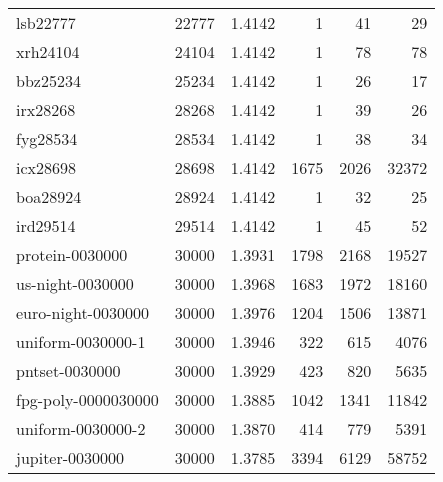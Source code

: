 \begin{tabular}{|lrrrrr|}
lsb22777 & 22777 & \num{1.4142} & \num{1} & \num{41} & \num{29} \\
xrh24104 & 24104 & \num{1.4142} & \num{1} & \num{78} & \num{78} \\
bbz25234 & 25234 & \num{1.4142} & \num{1} & \num{26} & \num{17} \\
irx28268 & 28268 & \num{1.4142} & \num{1} & \num{39} & \num{26} \\
fyg28534 & 28534 & \num{1.4142} & \num{1} & \num{38} & \num{34} \\
icx28698 & 28698 & \num{1.4142} & \num{1675} & \num{2026} & \num{32372} \\
boa28924 & 28924 & \num{1.4142} & \num{1} & \num{32} & \num{25} \\
ird29514 & 29514 & \num{1.4142} & \num{1} & \num{45} & \num{52} \\
protein-0030000 & 30000 & \num{1.3931} & \num{1798} & \num{2168} & \num{19527} \\
us-night-0030000 & 30000 & \num{1.3968} & \num{1683} & \num{1972} & \num{18160} \\
euro-night-0030000 & 30000 & \num{1.3976} & \num{1204} & \num{1506} & \num{13871} \\
uniform-0030000-1 & 30000 & \num{1.3946} & \num{322} & \num{615} & \num{4076} \\
pntset-0030000 & 30000 & \num{1.3929} & \num{423} & \num{820} & \num{5635} \\
fpg-poly-0000030000 & 30000 & \num{1.3885} & \num{1042} & \num{1341} & \num{11842} \\
uniform-0030000-2 & 30000 & \num{1.3870} & \num{414} & \num{779} & \num{5391} \\
jupiter-0030000 & 30000 & \num{1.3785} & \num{3394} & \num{6129} & \num{58752} \\
    \hline
    \end{tabular}
